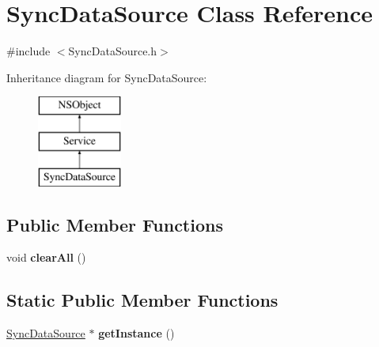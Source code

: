 \hypertarget{interface_sync_data_source}{
\section{\-Sync\-Data\-Source \-Class \-Reference}
\label{interface_sync_data_source}
}


{\ttfamily \#include $<$\-Sync\-Data\-Source.\-h$>$}

\-Inheritance diagram for \-Sync\-Data\-Source\-:\begin{figure}[H]
\begin{center}
\leavevmode
\includegraphics[height=3.000000cm]{interface_sync_data_source}
\end{center}
\end{figure}
\subsection*{\-Public \-Member \-Functions}
\begin{DoxyCompactItemize}
\item 
\hypertarget{interface_sync_data_source_ae6b9f102f533ca7f76a83525345ce209}{
void {\bfseries clear\-All} ()}
\label{interface_sync_data_source_ae6b9f102f533ca7f76a83525345ce209}

\end{DoxyCompactItemize}
\subsection*{\-Static \-Public \-Member \-Functions}
\begin{DoxyCompactItemize}
\item 
\hypertarget{interface_sync_data_source_a3e362e202a1c75b84d43c445628c5453}{
\hyperlink{interface_sync_data_source}{\-Sync\-Data\-Source} $\ast$ {\bfseries get\-Instance} ()}
\label{interface_sync_data_source_a3e362e202a1c75b84d43c445628c5453}

\end{DoxyCompactItemize}


